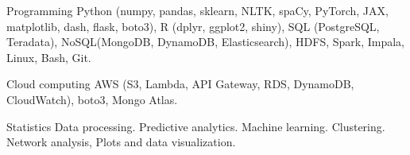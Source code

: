 


\begin{cvskills}


\cvskill
{Programming} %
{Python (numpy, pandas, sklearn, NLTK, spaCy, PyTorch, JAX, matplotlib, dash, flask, boto3), R (dplyr, ggplot2, shiny),} %
\cvskill
{}
{SQL (PostgreSQL, Teradata), NoSQL(MongoDB, DynamoDB, Elasticsearch), HDFS, Spark, Impala, Linux, Bash, Git.} %

\cvskill
{Cloud computing} %
{AWS (S3, Lambda, API Gateway, RDS, DynamoDB, CloudWatch), boto3, Mongo Atlas.}


\cvskill
{Statistics} %
{Data processing. Predictive analytics. Machine learning. Clustering. Network analysis, Plots and data visualization.} %









\end{cvskills}
